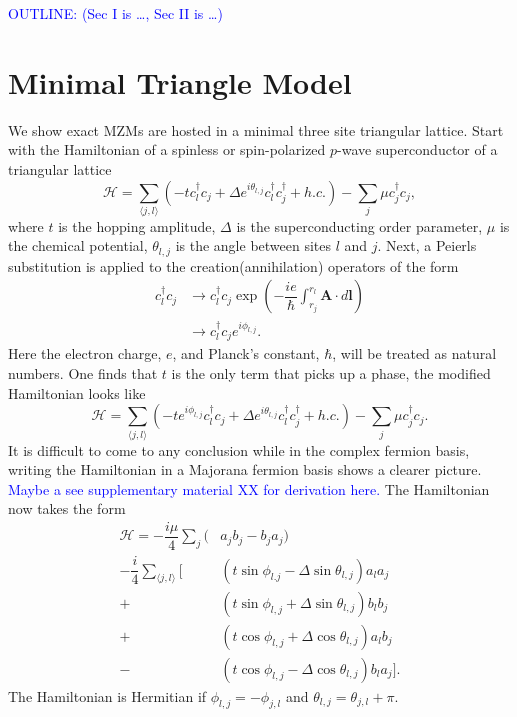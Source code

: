 \documentclass[aps,prb,showpacs,amsmath,amssymb,superscriptaddress]{revtex4-2}
\newcommand{\Blue}[1]{\textcolor{blue}{#1}}
\renewcommand{\vec}[1]{\mathbf{#1}}
\newcommand{\ham}{\mathcal{H}}
\newcommand{\cc}{c^{\dagger}}
\newcommand{\de}{\Delta}
\begin{document}
\Blue{OUTLINE: (Sec I is \dots, Sec II is \dots)}
\section{Minimal Triangle Model}

We show exact MZMs are hosted in a minimal three site triangular lattice.
Start with the Hamiltonian of a spinless or spin-polarized $p$-wave superconductor of a triangular lattice
\begin{equation}
  \ham = \sum_{\langle j, l \rangle} (-t\cc_{l} c_j + \de e^{i\theta_{l,j}} \cc_{l}\cc_j + h.c.) - \sum_{j} \mu \cc_j c_j,
\end{equation}
where $t$ is the hopping amplitude, $\de$ is the superconducting order parameter, $\mu$ is the chemical potential, $\theta_{l,j}$ is the angle between sites $l$ and $j$.
Next, a Peierls substitution is applied to the creation(annihilation) operators of the form
\begin{align}
  \cc_{l} c_j &\rightarrow \cc_{l} c_j \exp \left(-\dfrac{i e}{\hbar} \int_{r_j}^{r_{l}} \vec{A} \cdot d\vec{l} \right) \\ \nonumber
  &\rightarrow \cc_{l} c_j e^{i \phi_{l,j}}.
\end{align}
Here the electron charge, $e$, and Planck's constant, $\hbar$, will be treated as natural numbers.
One finds that $t$ is the only term that picks up a phase, the modified Hamiltonian looks like
\begin{equation} \label{eq: Peierls Hamiltonian}
  \ham = \sum_{\langle j,l \rangle} (-t e^{i\phi_{l,j}} \cc_{l} c_j + \de e^{i\theta_{l,j}} \cc_{l}\cc_j + h.c.) - \sum_j \mu \cc_j c_j.
\end{equation}
It is difficult to come to any conclusion while in the complex fermion basis, writing the Hamiltonian in a Majorana fermion basis shows a clearer picture.
\Blue{Maybe a see supplementary material XX for derivation here.}
The Hamiltonian now takes the form
\begin{align}
  \ham = -\dfrac{i\mu}{4} \sum_j (& a_j b_j - b_j a_j) \nonumber \\
  -\dfrac{i}{4} \sum_{\langle j,l \rangle} [&(t\sin\phi_{l.j}-\de\sin\theta_{l,j}) a_l a_j \nonumber \\
  +&(t\sin\phi_{l,j}+\de\sin\theta_{l,j}) b_l b_j \nonumber \\
  +&(t\cos\phi_{l,j}+\de\cos\theta_{l,j}) a_l b_j \nonumber \\
  -&(t\cos\phi_{l,j}-\de\cos\theta_{l,j}) b_l a_j].
\end{align}
The Hamiltonian is Hermitian if $\phi_{l,j} = -\phi_{j,l}$ and $\theta_{l,j} = \theta_{j,l} + \pi$.
\end{document}
